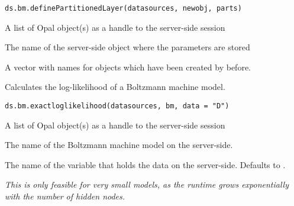 %
\begin{Usage}
\begin{verbatim}
ds.bm.definePartitionedLayer(datasources, newobj, parts)
\end{verbatim}
\end{Usage}
%
\begin{Arguments}
\begin{ldescription}
\item[\code{datasources}] A list of Opal object(s) as a handle to the server-side session

\item[\code{newobj}] The name of the server-side object where the parameters are stored

\item[\code{parts}] A vector with names for  objects which have been created
by  before.
\end{ldescription}
\end{Arguments}
%
\begin{Description}\relax
Calculates the log-likelihood of a Boltzmann machine model.
\end{Description}
%
\begin{Usage}
\begin{verbatim}
ds.bm.exactloglikelihood(datasources, bm, data = "D")
\end{verbatim}
\end{Usage}
%
\begin{Arguments}
\begin{ldescription}
\item[\code{datasources}] A list of Opal object(s) as a handle to the server-side session

\item[\code{bm}] The name of the Boltzmann machine model on the server-side.

\item[\code{data}] The name of the variable that holds the data on the server-side.
Defaults to .
\end{ldescription}
\end{Arguments}
%
\begin{Details}\relax
\emph{This is only feasible for very small models, as the runtime grows exponentially with
the number of hidden nodes.}
\end{Details}
